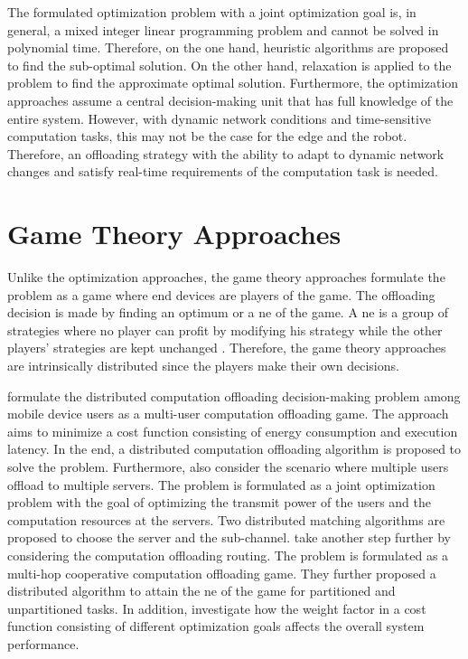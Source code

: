 The formulated optimization problem with a joint optimization goal is, in general, a mixed integer linear programming problem and cannot be solved in polynomial time. Therefore, on the one hand, heuristic algorithms are proposed to find the sub-optimal solution. On the other hand, relaxation is applied to the problem to find the approximate optimal solution. Furthermore, the optimization approaches assume a central decision-making unit that has full knowledge of the entire system. However, with dynamic network conditions and time-sensitive computation tasks, this may not be the case for the edge and the robot. Therefore, an offloading strategy with the ability to adapt to dynamic network changes and satisfy real-time requirements of the computation task is needed. 

\section{Game Theory Approaches}\label{sec:game_theory_approaches}

Unlike the optimization approaches, the game theory approaches formulate the problem as a game where end devices are players of the game. The offloading decision is made by finding an optimum or a \gls{ne} of the game. A \gls{ne} is a group of strategies where no player can profit by modifying his strategy while the other players’ strategies are kept unchanged \cite{Chaari2022}. Therefore, the game theory approaches are intrinsically distributed since the players make their own decisions. 

\citeauthor*{Chen2016} \cite{Chen2016} formulate the distributed computation offloading decision-making problem among mobile device users as a multi-user computation offloading game. The approach aims to minimize a cost function consisting of energy consumption and execution latency. In the end, a distributed computation offloading algorithm is proposed to solve the problem. Furthermore, \citeauthor*{Pham2018} \cite{Pham2018} also consider the scenario where multiple users offload to multiple servers. The problem is formulated as a joint optimization problem with the goal of optimizing the transmit power of the users and the computation resources at the servers. Two distributed matching algorithms are proposed to choose the server and the sub-channel. \citeauthor*{Hong2019} \cite{Hong2019} take another step further by considering the computation offloading routing. The problem is formulated as a multi-hop cooperative computation offloading game. They further proposed a distributed algorithm to attain the \gls{ne} of the game for partitioned and unpartitioned tasks. In addition, \citeauthor*{Xu2020} \cite{Xu2020} investigate how the weight factor in a cost function consisting of different optimization goals affects the overall system performance. 

